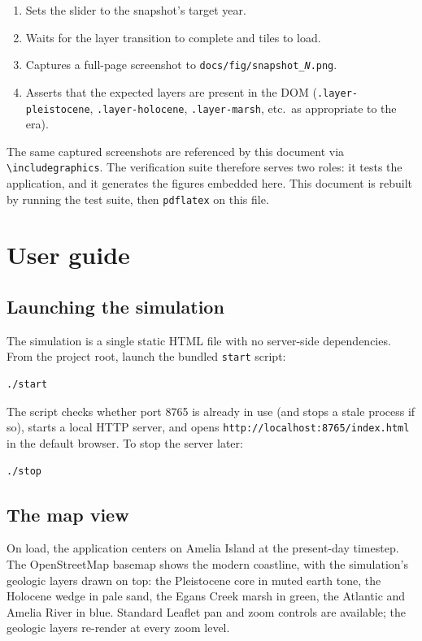 \documentclass[11pt]{article}
\begin{document}
\begin{enumerate}[leftmargin=2em]
\item Sets the slider to the snapshot's target year.
\item Waits for the layer transition to complete and tiles to load.
\item Captures a full-page screenshot to \texttt{docs/fig/snapshot\_\textit{N}.png}.
\item Asserts that the expected layers are present in the DOM
(\texttt{.layer-pleistocene}, \texttt{.layer-holocene}, \texttt{.layer-marsh},
etc.\ as appropriate to the era).
\end{enumerate}

The same captured screenshots are referenced by this document via
\texttt{\textbackslash includegraphics}. The verification suite therefore serves
two roles: it tests the application, and it generates the figures embedded here.
This document is rebuilt by running the test suite, then \texttt{pdflatex} on
this file.

\section{User guide}

\subsection{Launching the simulation}

The simulation is a single static HTML file with no server-side dependencies.
From the project root, launch the bundled \texttt{start} script:

\begin{Verbatim}[fontsize=\small]
./start
\end{Verbatim}

The script checks whether port 8765 is already in use (and stops a stale
process if so), starts a local HTTP server, and opens
\texttt{http://localhost:8765/index.html} in the default browser. To stop
the server later:

\begin{Verbatim}[fontsize=\small]
./stop
\end{Verbatim}

\subsection{The map view}

On load, the application centers on Amelia Island at the present-day timestep.
The OpenStreetMap basemap shows the modern coastline, with the simulation's
geologic layers drawn on top: the Pleistocene core in muted earth tone, the
Holocene wedge in pale sand, the Egans Creek marsh in green, the Atlantic and
Amelia River in blue. Standard Leaflet pan and zoom controls are available; the
geologic layers re-render at every zoom level.
\end{document}
